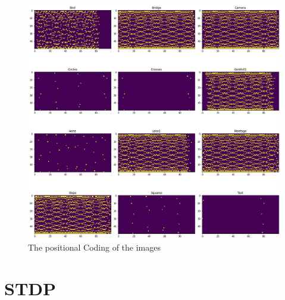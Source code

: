 \documentclass{article}
\begin{document}
	\begin{figure}[h]
		\includegraphics[width=1.2\textwidth]{images_pos.png}
		\caption{The positional Coding of the images}
		\label{impos}
	\end{figure}
	
	\section{STDP}
\end{document}
